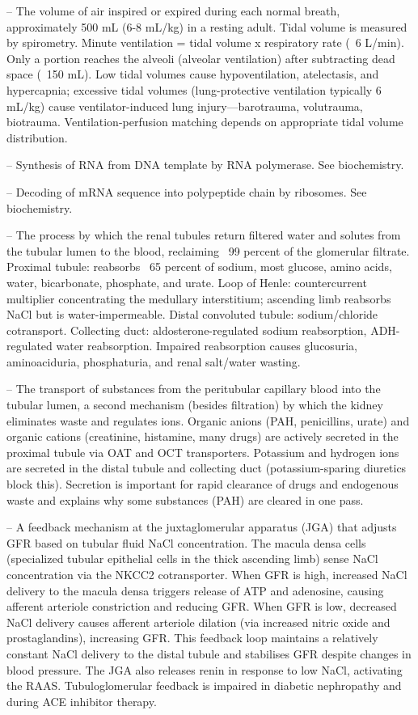 -- The volume of air inspired or expired during each normal breath, approximately 500 mL (6-8 mL/kg) in a resting adult. Tidal volume is measured by spirometry. Minute ventilation = tidal volume x respiratory rate (~6 L/min). Only a portion reaches the alveoli (alveolar ventilation) after subtracting dead space (~150 mL). Low tidal volumes cause hypoventilation, atelectasis, and hypercapnia; excessive tidal volumes (lung-protective ventilation typically 6 mL/kg) cause ventilator-induced lung injury—barotrauma, volutrauma, biotrauma. Ventilation-perfusion matching depends on appropriate tidal volume distribution.

-- Synthesis of RNA from DNA template by RNA polymerase. See biochemistry.

-- Decoding of mRNA sequence into polypeptide chain by ribosomes. See biochemistry.

-- The process by which the renal tubules return filtered water and solutes from the tubular lumen to the blood, reclaiming ~99 percent of the glomerular filtrate. Proximal tubule: reabsorbs ~65 percent of sodium, most glucose, amino acids, water, bicarbonate, phosphate, and urate. Loop of Henle: countercurrent multiplier concentrating the medullary interstitium; ascending limb reabsorbs NaCl but is water-impermeable. Distal convoluted tubule: sodium/chloride cotransport. Collecting duct: aldosterone-regulated sodium reabsorption, ADH-regulated water reabsorption. Impaired reabsorption causes glucosuria, aminoaciduria, phosphaturia, and renal salt/water wasting.

-- The transport of substances from the peritubular capillary blood into the tubular lumen, a second mechanism (besides filtration) by which the kidney eliminates waste and regulates ions. Organic anions (PAH, penicillins, urate) and organic cations (creatinine, histamine, many drugs) are actively secreted in the proximal tubule via OAT and OCT transporters. Potassium and hydrogen ions are secreted in the distal tubule and collecting duct (potassium-sparing diuretics block this). Secretion is important for rapid clearance of drugs and endogenous waste and explains why some substances (PAH) are cleared in one pass.

-- A feedback mechanism at the juxtaglomerular apparatus (JGA) that adjusts GFR based on tubular fluid NaCl concentration. The macula densa cells (specialized tubular epithelial cells in the thick ascending limb) sense NaCl concentration via the NKCC2 cotransporter. When GFR is high, increased NaCl delivery to the macula densa triggers release of ATP and adenosine, causing afferent arteriole constriction and reducing GFR. When GFR is low, decreased NaCl delivery causes afferent arteriole dilation (via increased nitric oxide and prostaglandins), increasing GFR. This feedback loop maintains a relatively constant NaCl delivery to the distal tubule and stabilises GFR despite changes in blood pressure. The JGA also releases renin in response to low NaCl, activating the RAAS. Tubuloglomerular feedback is impaired in diabetic nephropathy and during ACE inhibitor therapy.

